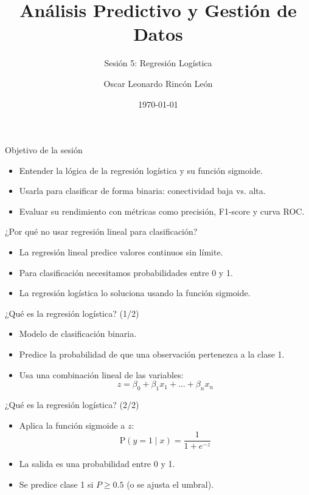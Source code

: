 \documentclass{beamer}
\title{Análisis Predictivo y Gestión de Datos}
\subtitle{Sesión 5: Regresión Logística}
\author{Oscar Leonardo Rincón León}
\date{\today}
\begin{document}
\frame{\titlepage}

\begin{frame}{Objetivo de la sesión}
\begin{itemize}
    \item Entender la lógica de la regresión logística y su función sigmoide.
    \item Usarla para clasificar de forma binaria: conectividad baja vs. alta.
    \item Evaluar su rendimiento con métricas como precisión, F1-score y curva ROC.
\end{itemize}
\end{frame}

\begin{frame}{¿Por qué no usar regresión lineal para clasificación?}
\begin{itemize}
    \item La regresión lineal predice valores continuos sin límite.
    \item Para clasificación necesitamos probabilidades entre 0 y 1.
    \item La regresión logística lo soluciona usando la función sigmoide.
\end{itemize}
\end{frame}

\begin{frame}{¿Qué es la regresión logística? (1/2)}
\begin{itemize}
    \item Modelo de clasificación binaria.
    \item Predice la probabilidad de que una observación pertenezca a la clase 1.
    \item Usa una combinación lineal de las variables:
    \[
    z = \beta_0 + \beta_1 x_1 + \dots + \beta_n x_n
    \]
\end{itemize}
\end{frame}

\begin{frame}{¿Qué es la regresión logística? (2/2)}
\begin{itemize}
    \item Aplica la función sigmoide a $z$:
    \[
    \text{P}(y=1 \mid x) = \frac{1}{1 + e^{-z}}
    \]
    \item La salida es una probabilidad entre 0 y 1.
    \item Se predice clase 1 si $P \geq 0.5$ (o se ajusta el umbral).
\end{itemize}
\end{frame}
\end{document}
